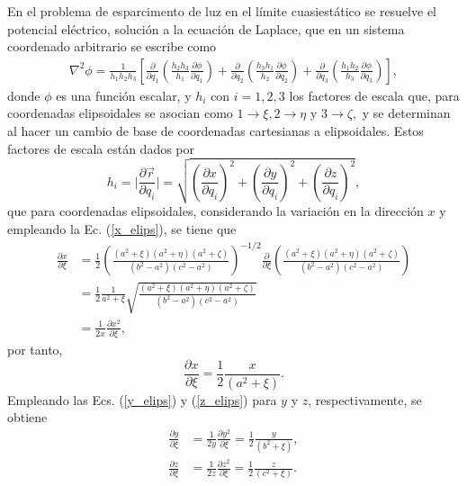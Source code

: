 En el problema de esparcimento de luz en el límite cuasiestático se resuelve el potencial eléctrico, solución a la ecuación de Laplace, que en un sistema coordenado arbitrario se escribe como \cite{Arfken}
\begin{align}
	\nabla^2\phi=\frac{1}{h_1h_2h_3}\left[\frac{\partial}{\partial q_1}\left(\frac{h_2h_3}{h_1}\frac{\partial\phi}{\partial q_1}\right)+\frac{\partial}{\partial q_2}\left(\frac{h_3h_1}{h_2}\frac{\partial\phi}{\partial q_2}\right)+\frac{\partial}{\partial q_3}\left(\frac{h_1h_2}{h_3}\frac{\partial\phi}{\partial q_3}\right)\right],
	\label{laplaciano}    
\end{align}
donde $\phi$ es una función escalar, y  $h_i$ con $i=1,2,3$ los factores de escala que, para coordenadas elipsoidales se asocian como $1\rightarrow\xi, 2\rightarrow\eta$ y $3\rightarrow\zeta,$ y se determinan al hacer un cambio de base de coordenadas cartesianas a elipsoidales. Estos factores de escala están dados por \cite{Arfken}
\begin{equation}
	h_i=\Big|\frac{\partial \Vec{r}}{\partial q_i}\Big|=\sqrt{\left(\frac{\partial x}{\partial q_i}\right)^2+\left(\frac{\partial y}{\partial q_i}\right)^2+\left(\frac{\partial z}{\partial q_i}\right)^2},
\end{equation} 
que para coordenadas elipsoidales, considerando la variación en la dirección $x$ y empleando la Ec. (\ref{x_elips}), se tiene que \begin{align*}
	\frac{\partial x}{\partial \xi}&=\frac{1}{2}\left(\frac{(a^2+\xi)(a^2+\eta)(a^2+\zeta)}{(b^2-a^2)(c^2-a^2)}\right)^{-1/2}\frac{\partial}{\partial \xi}\left(\frac{(a^2+\xi)(a^2+\eta)(a^2+\zeta)}{(b^2-a^2)(c^2-a^2)}\right)\nonumber\\
	&=\frac{1}{2}\frac{1}{a^2+\xi}\sqrt{\frac{(a^2+\xi)(a^2+\eta)(a^2+\zeta)}{(b^2-a^2)(c^2-a^2)}}\nonumber\\
	&=\frac{1}{2x}\frac{\partial x^2}{\partial\xi},
\end{align*}
por tanto,
\begin{equation*}
	\frac{\partial x}{\partial \xi}=\frac{1}{2}\frac{x}{(a^2+\xi)}.
\end{equation*}
Empleando las Ecs. (\ref{y_elips}) y (\ref{z_elips}) para $y$ y $z$, respectivamente, se obtiene
\begin{align*}
	\frac{\partial y}{\partial \xi}&=\frac{1}{2y}\frac{\partial y^2}{\partial\xi}=\frac{1}{2}\frac{y}{(b^2+\xi)},\\
	\frac{\partial z}{\partial \xi}&=\frac{1}{2z}\frac{\partial z^2}{\partial\xi}=\frac{1}{2}\frac{z}{(c^2+\xi)}.
\end{align*}
